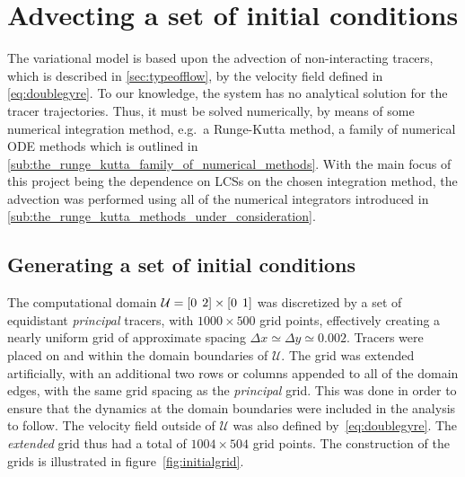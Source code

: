 \section{Advecting a set of initial conditions}
\label{sec:advecting_a_set_of_initial_conditions}

The variational model is based upon the advection of non-interacting tracers,
which is described in \cref{sec:typeofflow}, by the velocity field defined in
\cref{eq:doublegyre}. To our knowledge, the system has no analytical
solution for the tracer trajectories. Thus, it must be solved numerically, by
means of some numerical integration method, e.g.\ a Runge-Kutta method, a
family of numerical ODE methods which is outlined in
\cref{sub:the_runge_kutta_family_of_numerical_methods}. With the main focus of
this project being the dependence on LCSs on the chosen integration method, the
advection was performed using all of the numerical integrators introduced in
\cref{sub:the_runge_kutta_methods_under_consideration}.

\subsection{Generating a set of initial conditions}
\label{sub:generating_a_set_of_initial_conditions}
The computational domain $\mathcal{U}=[0\hspace{1ex}2]\times[0\hspace{1ex}1]$
was discretized by a set of equidistant \emph{principal} tracers, with
$1000\times500$  grid points, effectively creating a nearly uniform grid of
approximate spacing $\Delta{x}\simeq\Delta{y}\simeq0.002$. Tracers were placed
on and within the domain boundaries of $\mathcal{U}$. The grid was extended
artificially, with an additional two rows or columns appended to all of the
domain edges, with the same grid spacing as the \emph{principal} grid. This was
done in order  to ensure that the dynamics at the domain boundaries were
included in the analysis to follow. The velocity field outside of
$\mathcal{U}$ was also defined by~\cref{eq:doublegyre}. The
\emph{extended} grid thus had a total of $1004\times504$ grid points.
The construction of the grids is illustrated in figure~\ref{fig:initialgrid}.
\clearpage


